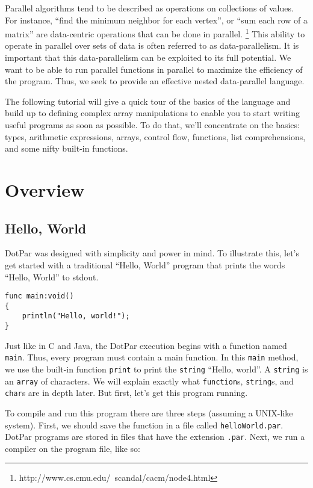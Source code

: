 Parallel algorithms tend to be described as operations on collections of values. For instance, ``find the minimum neighbor for each vertex'', or ``sum each row of a matrix'' are data-centric operations that can be done in parallel. \footnote{http://www.cs.cmu.edu/~scandal/cacm/node4.html} This ability to operate in parallel over sets of data is often referred to as data-parallelism. It is important that this data-parallelism can be exploited to its full potential. We want to be able to run parallel functions in parallel to maximize the efficiency of the program. Thus, we seek to provide an effective nested data-parallel language.

The following tutorial will give a quick tour of the basics of the language and build up to defining complex array manipulations to enable you to start writing useful programs as soon as possible. To do that, we'll concentrate on the basics: types, arithmetic expressions, arrays, control flow, functions, list comprehensions, and some nifty built-in functions.

\section{Overview}
\subsection{Hello, World}
DotPar was designed with simplicity and power in mind. To illustrate this, let's get started with a traditional ``Hello, World'' program that prints the words ``Hello, World'' to stdout.

\begin{verbatim}
func main:void()
{
    println("Hello, world!");
}
\end{verbatim}

Just like in C and Java, the DotPar execution begins with a function named \verb=main=. Thus, every program must contain a main function. In this \verb=main= method, we use the built-in function \verb=print= to print the \verb=string= ``Hello, world''. A \verb=string= is an \verb=array= of characters. We will explain exactly what \verb=function=s, \verb=string=s, and \verb=char=s are in depth later. But first, let's get this program running.

To compile and run this program there are three steps (assuming a UNIX-like system). First, we should save the function in a file called \verb=helloWorld.par=. DotPar programs are stored in files that have the extension \verb=.par=. Next, we run a compiler on the program file, like so:

